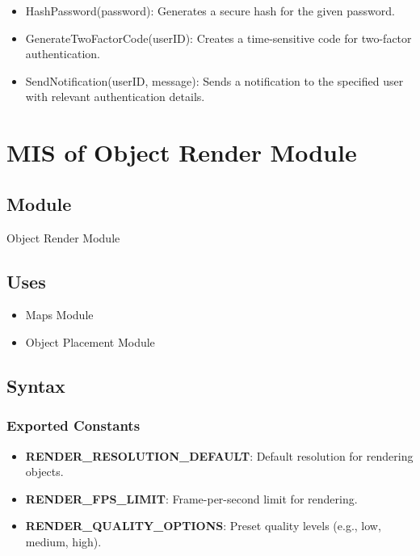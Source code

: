 \documentclass[12pt, titlepage]{article}
\begin{document}
\begin{itemize}
    \item HashPassword(password): Generates a secure hash for the given password.
    \item GenerateTwoFactorCode(userID): Creates a time-sensitive code for two-factor authentication.
    \item SendNotification(userID, message): Sends a notification to the specified user with relevant authentication details.
\end{itemize}

\newpage

\section{MIS of Object Render Module} \label{ObjectRenderModule}

\subsection{Module}

Object Render Module

\subsection{Uses}

\begin{itemize}
    \item Maps Module
    \item Object Placement Module
\end{itemize}

\subsection{Syntax}

\subsubsection{Exported Constants}

\begin{itemize}
    \item \textbf{RENDER\_RESOLUTION\_DEFAULT}: Default resolution for rendering objects.
    \item \textbf{RENDER\_FPS\_LIMIT}: Frame-per-second limit for rendering.
    \item \textbf{RENDER\_QUALITY\_OPTIONS}: Preset quality levels (e.g., low, medium, high).
\end{itemize}
\end{document}
